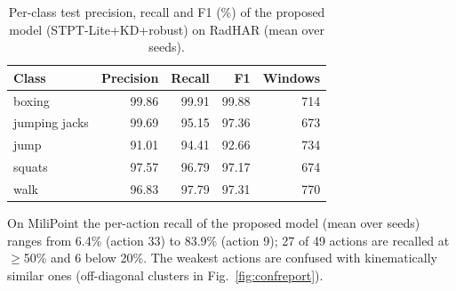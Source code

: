 \begin{table}[h]
\centering
\caption{Per-class test precision, recall and F1 (\%) of the proposed model (STPT-Lite+KD+robust) on RadHAR (mean over seeds).}
\label{tab:perclass}
\begin{tabular}{lrrrr}
\toprule
Class & Precision & Recall & F1 & Windows \\
\midrule
boxing & 99.86 & 99.91 & 99.88 & 714 \\
jumping jacks & 99.69 & 95.15 & 97.36 & 673 \\
jump & 91.01 & 94.41 & 92.66 & 734 \\
squats & 97.57 & 96.79 & 97.17 & 674 \\
walk & 96.83 & 97.79 & 97.31 & 770 \\
\bottomrule
\end{tabular}
\end{table}
On MiliPoint the per-action recall of the proposed model (mean over seeds) ranges from 6.4\% (action 33) to 83.9\% (action 9); 27 of 49 actions are recalled at $\geq$50\% and 6 below 20\%. The weakest actions are confused with kinematically similar ones (off-diagonal clusters in Fig.~\ref{fig:confreport}).